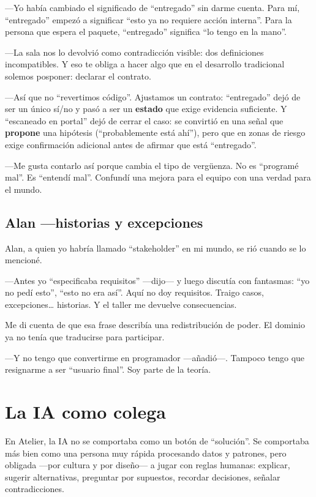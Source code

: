 \documentclass[11pt,a4paper]{article}
\begin{document}
---Yo había cambiado el significado de ``entregado'' sin darme cuenta. Para
mí, ``entregado'' empezó a significar ``esto ya no requiere acción interna''.
Para la persona que espera el paquete, ``entregado'' significa ``lo tengo en
la mano''.

---La sala nos lo devolvió como contradicción visible: dos definiciones
incompatibles. Y eso te obliga a hacer algo que en el desarrollo tradicional
solemos posponer: declarar el contrato.

---Así que no ``revertimos código''. Ajustamos un contrato: ``entregado'' dejó
de ser un único sí/no y pasó a ser un \textbf{estado} que exige evidencia
suficiente. Y ``escaneado en portal'' dejó de cerrar el caso: se convirtió en
una señal que \textbf{propone} una hipótesis (``probablemente está ahí''),
pero que en zonas de riesgo exige confirmación adicional antes de afirmar que
está ``entregado''.

---Me gusta contarlo así porque cambia el tipo de vergüenza. No es ``programé
mal''. Es ``entendí mal''. Confundí una mejora para el equipo con una verdad
para el mundo.

\subsection{Alan ---historias y excepciones}

Alan, a quien yo habría llamado ``stakeholder'' en mi mundo, se rió cuando se
lo mencioné.

---Antes yo ``especificaba requisitos'' ---dijo--- y luego discutía con
fantasmas: ``yo no pedí esto'', ``esto no era así''. Aquí no doy requisitos.
Traigo casos, excepciones\ldots{} historias. Y el taller me devuelve
consecuencias.

Me di cuenta de que esa frase describía una redistribución de poder. El
dominio ya no tenía que traducirse para participar.

---Y no tengo que convertirme en programador ---añadió---. Tampoco tengo que
resignarme a ser ``usuario final''. Soy parte de la teoría.

\section{La IA como colega}

En Atelier, la IA no se comportaba como un botón de ``solución''. Se
comportaba más bien como una persona muy rápida procesando datos y patrones,
pero obligada ---por cultura y por diseño--- a jugar con reglas humanas:
explicar, sugerir alternativas, preguntar por supuestos, recordar decisiones,
señalar contradicciones.
\end{document}
